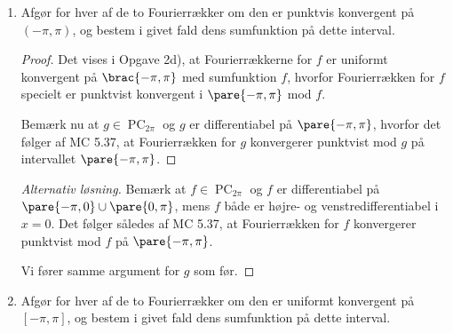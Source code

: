 \documentclass{article}
\begin{document}
\begin{opg}
\begin{enumerate}
\item Afgør for hver af de to Fourierrækker om den er punktvis konvergent på
$(-\pi,\pi)$, og bestem i givet fald dens sumfunktion på dette interval.

\begin{proof}
Det vises i Opgave 2d), at Fourierrækkerne for $f$ er uniformt konvergent på $\brac{-\pi,\pi}$ med sumfunktion $f$, hvorfor Fourierrækken for $f$ specielt er punktvist konvergent i $\pare{-\pi,\pi}$ mod $f$.

Bemærk nu at $g\in\operatorname{PC}_{2\pi}$ og $g$ er differentiabel på $\pare{-\pi,\pi}$, hvorfor det følger af MC 5.37, at Fourierrækken for $g$ konvergerer punktvist mod $g$ på intervallet $\pare{-\pi,\pi}$.
\end{proof}

\begin{proof}[Alternativ løsning]
Bemærk at $f\in\operatorname{PC}_{2\pi}$ og $f$ er differentiabel på $\pare{-\pi,0}\cup\pare{0,\pi}$, mens $f$ både er højre- og venstredifferentiabel i $x=0$. Det følger således af MC 5.37, at Fourierrækken for $f$ konvergerer punktvist mod $f$ på $\pare{-\pi,\pi}$.

Vi fører samme argument for $g$ som før.
\end{proof}

\item Afgør for hver af de to Fourierrækker om den er uniformt konvergent på
$[-\pi,\pi]$, og bestem i givet fald dens sumfunktion på dette interval.


\end{enumerate}
\end{opg}
\end{document}
